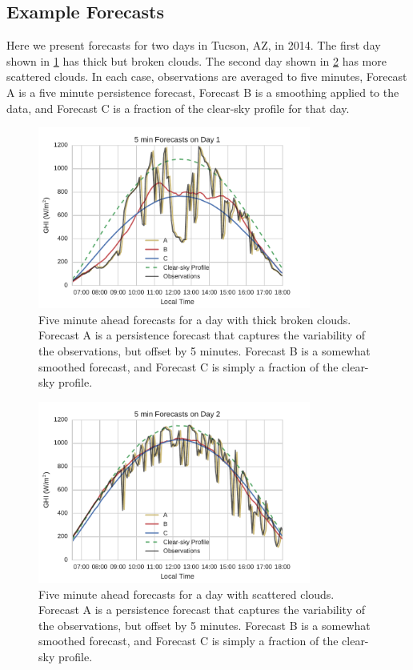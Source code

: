\subsection{Example Forecasts}
Here we present forecasts for two days in Tucson, AZ, in 2014.
The first day shown in \cref{fig:5minfx_day1} has thick but broken
clouds.
The second day shown in \cref{fig:5minfx_day2} has more scattered
clouds.
In each case, observations are averaged to five minutes, Forecast A is
a five minute persistence forecast, Forecast B is a smoothing applied
to the data, and Forecast C is a fraction of the clear-sky profile for
that day.

\begin{figure}[tbp]
\centering
\includegraphics[width=0.8\textwidth]{figs/error_fx_Day_1.pdf}
\caption[Forecasts for a day with thick, broken clouds]{Five minute
  ahead forecasts for a day with thick broken clouds. Forecast A is a
  persistence forecast that captures the variability of the
  observations, but offset by 5 minutes. Forecast B is a somewhat
  smoothed forecast, and Forecast C is simply a fraction of the
  clear-sky profile.}
\label{fig:5minfx_day1}
\end{figure}

\begin{figure}[tbp]
\centering
\includegraphics[width=0.8\textwidth]{figs/error_fx_Day_2.pdf}
\caption[Forecasts for a day with scattered clouds]{Five minute
  ahead forecasts for a day with scattered clouds. Forecast A is a
  persistence forecast that captures the variability of the
  observations, but offset by 5 minutes. Forecast B is a somewhat
  smoothed forecast, and Forecast C is simply a fraction of the
  clear-sky profile.}
\label{fig:5minfx_day2}
\end{figure}

